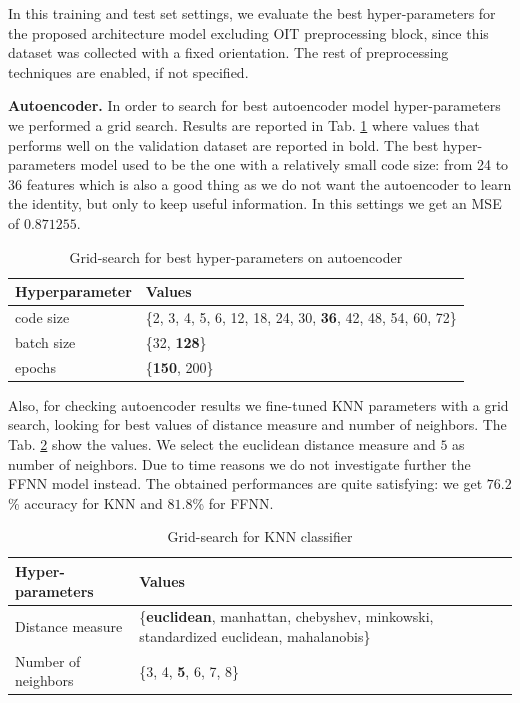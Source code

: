 In this training and test set settings, we evaluate the best
hyper-parameters for the proposed architecture model excluding OIT
preprocessing block, since this dataset was collected with a fixed
orientation. The rest of preprocessing techniques are enabled, if not
specified.

\textbf{Autoencoder.} In order to search for best autoencoder model
hyper-parameters we performed a grid search. Results are reported in
Tab. \ref{tab:ae-hyperparams} where values that performs well on the
validation dataset are reported in bold. The best hyper-parameters
model used to be the one with a relatively small code size: from 24 to
36 features which is also a good thing as we do not want the
autoencoder to learn the identity, but only to keep useful
information. In this settings we get an MSE of $0.871255$.
\begin{table}[h]
  \centering
  \begin{tabular}{lp{4cm}}
    \hline
    Hyperparameter & Values \\
    \hline
    code size & \{2, 3, 4, 5, 6, 12, 18, 24, 30, \textbf{36}, 42, 48, 54, 60, 72\} \\
    batch size & \{32, \textbf{128}\} \\
    epochs & \{\textbf{150}, 200\} \\
    \hline
  \end{tabular}
  \caption{Grid-search for best hyper-parameters on autoencoder}
  \label{tab:ae-hyperparams}
\end{table}

Also, for checking autoencoder results we fine-tuned KNN parameters
with a grid search, looking for best values of distance measure and
number of neighbors. The Tab. \ref{tab:knn-grid-search} show the values.
We select the euclidean distance measure and $5$ as number of neighbors.
Due to time reasons we do not investigate further the FFNN model instead.
The obtained performances are quite satisfying: we get $76.2$\% accuracy
for KNN and $81.8$\% for FFNN.
\begin{table}[h]
  \centering
  \begin{tabular}{p{2cm}p{4.5cm}}
    \hline
    Hyper-parameters & Values \\
    \hline
    Distance measure & \{\textbf{euclidean}, manhattan, chebyshev, minkowski, standardized euclidean, mahalanobis\} \\
    Number of neighbors & \{3, 4, \textbf{5}, 6, 7, 8\} \\
    \hline
  \end{tabular}
  \caption{Grid-search for KNN classifier}
  \label{tab:knn-grid-search}
\end{table}

